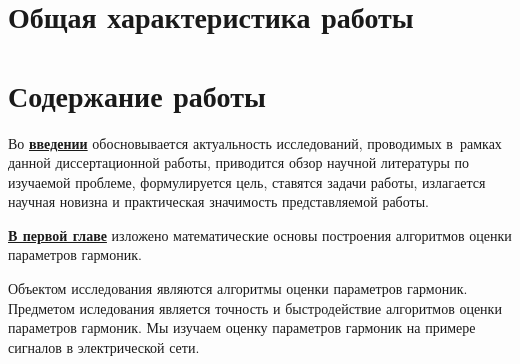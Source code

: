 \section*{Общая характеристика работы}

\newcommand{\actuality}{\underline{\textbf{\actualityTXT}}}
\newcommand{\progress}{\underline{\textbf{\progressTXT}}}
\newcommand{\aim}{\underline{{\textbf\aimTXT}}}
\newcommand{\tasks}{\underline{\textbf{\tasksTXT}}}
\newcommand{\novelty}{\underline{\textbf{\noveltyTXT}}}
\newcommand{\influence}{\underline{\textbf{\influenceTXT}}}
\newcommand{\methods}{\underline{\textbf{\methodsTXT}}}
\newcommand{\defpositions}{\underline{\textbf{\defpositionsTXT}}}
\newcommand{\reliability}{\underline{\textbf{\reliabilityTXT}}}
\newcommand{\probation}{\underline{\textbf{\probationTXT}}}
\newcommand{\contribution}{\underline{\textbf{\contributionTXT}}}
\newcommand{\publications}{\underline{\textbf{\publicationsTXT}}}




\section*{Содержание работы}
Во \underline{\textbf{введении}} обосновывается актуальность
исследований, проводимых в~рамках данной диссертационной работы,
приводится обзор научной литературы по изучаемой проблеме,
формулируется цель, ставятся задачи работы, излагается научная новизна
и практическая значимость представляемой работы. 

\underline{\textbf{В первой главе}} изложено %
математические основы построения алгоритмов оценки параметров гармоник.

Объектом исследования являются алгоритмы оценки параметров гармоник. Предметом иследования является точность и быстродействие алгоритмов оценки параметров гармоник. Мы изучаем оценку параметров гармоник на примере сигналов в электрической сети.

